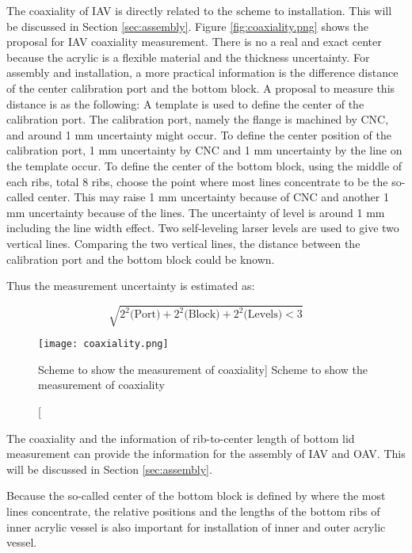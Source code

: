 The coaxiality of IAV is directly related to the scheme to installation.
This will be discussed in Section \ref{sec:assembly}.
Figure \ref{fig:coaxiality.png} shows the proposal for IAV coaxiality measurement.
There is no a real and exact center because the acrylic is a flexible material and
the thickness uncertainty. For assembly and installation, a more practical information is the difference
distance of the center calibration port and the bottom block.
A proposal to measure this distance is as the following:
A template is used to define the center of the calibration port.
The calibration port, namely the flange is machined by CNC, and around 1 mm uncertainty might occur.
To define the center position of the calibration port,
1 mm uncertainty by CNC and 1 mm uncertainty by the line on the template occur.
To define the center of the bottom block, using the middle of each ribs, total 8 ribs, choose
the point where most lines concentrate to be the so-called center.
This may raise 1 mm uncertainty because of CNC and
another 1 mm uncertainty because of the lines.
The uncertainty of level is around 1 mm including the line width effect.
Two self-leveling larser levels are used to give two vertical lines.
Comparing the two vertical lines, the distance between the calibration port and the bottom
block could be known.

Thus the measurement uncertainty is estimated as:


\begin{equation}
\label{equ:coaxiality}
\sqrt{
2^2\mbox{(Port)} +
2^2\mbox{(Block)} +
2^2\mbox{(Levels)} < 3
}
\end{equation}


\begin{figure}
    \centering
    \texttt{[image: coaxiality.png]}
    \caption
    [Scheme to show the measurement of coaxiality]
    {Scheme to show the measurement of coaxiality}
    \label{fig:coaxiality}
    \end{figure}


The coaxiality and the information of rib-to-center length of bottom lid measurement can
provide the information for the assembly of IAV and OAV. This will be discussed in Section \ref{sec:assembly}.

Because the so-called center of the bottom block is defined by where the most lines concentrate,
the relative positions and the lengths of the bottom ribs of inner acrylic vessel is also important for installation of
inner and outer acrylic vessel.

